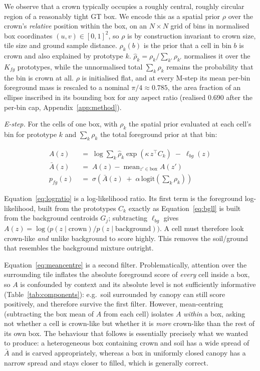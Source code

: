 \documentclass[remotesensing,article,submit,moreauthors]{Definitions/mdpi}
\begin{document}
We observe that a crown typically occupies a roughly central, roughly circular region of a reasonably tight GT box. We encode this as a spatial prior $\rho$ over the crown's \emph{relative} position within the box, on an $N \times N$ grid of bins in normalised box coordinates $(u, v) \in [0,1]^2$, so $\rho$ is by construction invariant to crown size, tile size and ground sample distance. $\rho_k(b)$ is the prior that a cell in bin $b$ is crown and also explained by prototype $k$. $\hat\rho_k = \rho_k / \sum_{k'} \rho_{k'}$ normalises it over the $K_{fg}$ prototypes, while the unnormalised total $\sum_k \rho_k$ remains the probability that the bin is crown at all. $\rho$ is initialised flat, and at every M-step its mean per-bin foreground mass is rescaled to a nominal $\pi/4 \approx 0.785$, the area fraction of an ellipse inscribed in its bounding box for any aspect ratio (realised $0.690$ after the per-bin cap, Appendix~\ref{app:method}).

\medskip\noindent\emph{E-step.} For the cells of one box, with $\rho_k$ the spatial prior evaluated at each cell's bin for prototype $k$ and $\sum_k \rho_k$ the total foreground prior at that bin:

\begin{align}
A(z) &\;=\; \log \textstyle\sum_k \hat\rho_k \exp\!\left(\kappa\, z^{\top} C_k\right) \;-\; \ell_{bg}(z)
\label{eq:logratio}\\[2pt]
\bar A(z) &\;=\; A(z) - \operatorname{mean}_{z' \in \mathrm{box}} A(z')
\label{eq:meancentre}\\[2pt]
p_{fg}(z) &\;=\; \sigma\!\left(\bar A(z) \;+\; \alpha \, \mathrm{logit}\!\left(\textstyle\sum_k \rho_k\right)\right)
\label{eq:posterior}
\end{align}

Equation~\eqref{eq:logratio} is a log-likelihood ratio. Its first term is the foreground log-likelihood, built from the prototypes $C_k$ exactly as Equation~\eqref{eq:bgll} is built from the background centroids $G_j$; subtracting $\ell_{bg}$ gives $A(z) = \log\!\big(p(z \mid \text{crown}) / p(z \mid \text{background})\big)$. A cell must therefore look crown-like \emph{and} unlike background to score highly. This removes the soil/ground that resembles the background mixture outright.

Equation~\eqref{eq:meancentre} is a second filter. Problematically, attention over the surrounding tile inflates the absolute foreground score of \emph{every} cell inside a box, so $A$ is confounded by context and its absolute level is not sufficiently informative (Table~\ref{tab:components}): e.g.\ soil surrounded by canopy can still score positively, and therefore survive the first filter. However, mean-centring (subtracting the box mean of $A$ from each cell) isolates $A$ \emph{within} a box, asking not whether a cell is crown-like but whether it is \emph{more} crown-like than the rest of its own box. The behaviour that follows is essentially precisely what we wanted to produce: a heterogeneous box containing crown and soil has a wide spread of $\bar A$ and is carved appropriately, whereas a box in uniformly closed canopy has a narrow spread and stays closer to filled, which is generally correct.
\end{document}
